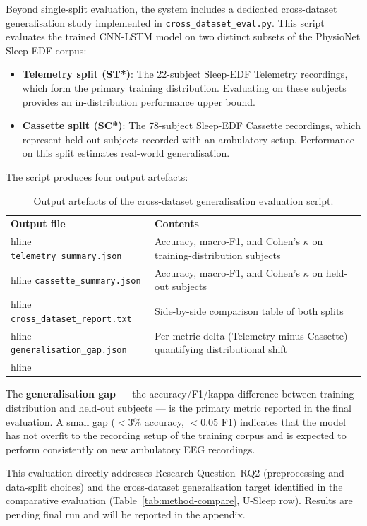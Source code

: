 \documentclass[10pt]{article}
\begin{document}
Beyond single-split evaluation, the system includes a dedicated cross-dataset generalisation study implemented in \texttt{cross\_dataset\_eval.py}. This script evaluates the trained CNN-LSTM model on two distinct subsets of the PhysioNet Sleep-EDF corpus:

\begin{itemize}
  \item \textbf{Telemetry split (ST*)}: The 22-subject Sleep-EDF Telemetry recordings, which form the primary training distribution. Evaluating on these subjects provides an in-distribution performance upper bound.
  \item \textbf{Cassette split (SC*)}: The 78-subject Sleep-EDF Cassette recordings, which represent held-out subjects recorded with an ambulatory setup. Performance on this split estimates real-world generalisation.
\end{itemize}

The script produces four output artefacts:

\begin{table}[h]
\centering
\small
\renewcommand{\arraystretch}{1.2}
\begin{tabular}{|l|p{9.0cm}|}
\hline
\textbf{Output file} & \textbf{Contents} \\hline
\texttt{telemetry\_summary.json} & Accuracy, macro-F1, and Cohen's $\kappa$ on training-distribution subjects \\hline
\texttt{cassette\_summary.json} & Accuracy, macro-F1, and Cohen's $\kappa$ on held-out subjects \\hline
\texttt{cross\_dataset\_report.txt} & Side-by-side comparison table of both splits \\hline
\texttt{generalisation\_gap.json} & Per-metric delta (Telemetry minus Cassette) quantifying distributional shift \\hline
\end{tabular}
\caption{Output artefacts of the cross-dataset generalisation evaluation script.}
\label{tab:cross-dataset}
\end{table}

The \textbf{generalisation gap} --- the accuracy/F1/kappa difference between training-distribution and held-out subjects --- is the primary metric reported in the final evaluation. A small gap ($<3$\% accuracy, $<0.05$ F1) indicates that the model has not overfit to the recording setup of the training corpus and is expected to perform consistently on new ambulatory EEG recordings.

This evaluation directly addresses Research Question~RQ2 (preprocessing and data-split choices) and the cross-dataset generalisation target identified in the comparative evaluation (Table~\ref{tab:method-compare}, U-Sleep row). Results are pending final run and will be reported in the appendix.
\end{document}
